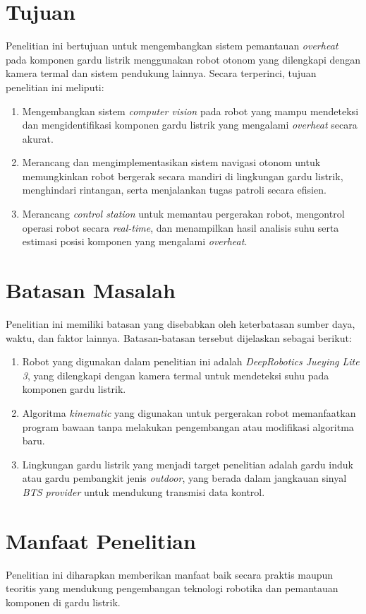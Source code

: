 \section{Tujuan}
Penelitian ini bertujuan untuk mengembangkan sistem pemantauan \emph{overheat} pada komponen gardu listrik menggunakan robot otonom yang dilengkapi dengan kamera termal dan sistem pendukung lainnya. Secara terperinci, tujuan penelitian ini meliputi:
\begin{enumerate}
    \item Mengembangkan sistem \emph{computer vision} pada robot yang mampu mendeteksi dan mengidentifikasi komponen gardu listrik yang mengalami \emph{overheat} secara akurat.
    \item Merancang dan mengimplementasikan sistem navigasi otonom untuk memungkinkan robot bergerak secara mandiri di lingkungan gardu listrik, menghindari rintangan, serta menjalankan tugas patroli secara efisien.
    \item Merancang \emph{control station} untuk memantau pergerakan robot, mengontrol operasi robot secara \emph{real-time}, dan menampilkan hasil analisis suhu serta estimasi posisi komponen yang mengalami \emph{overheat}.
\end{enumerate}

\section{Batasan Masalah}
Penelitian ini memiliki batasan yang disebabkan oleh keterbatasan sumber daya, waktu, dan faktor lainnya. Batasan-batasan tersebut dijelaskan sebagai berikut:
\begin{enumerate}
    \item Robot yang digunakan dalam penelitian ini adalah \emph{DeepRobotics Jueying Lite 3}, yang dilengkapi dengan kamera termal untuk mendeteksi suhu pada komponen gardu listrik.
    \item Algoritma \emph{kinematic} yang digunakan untuk pergerakan robot memanfaatkan program bawaan tanpa melakukan pengembangan atau modifikasi algoritma baru.
    \item Lingkungan gardu listrik yang menjadi target penelitian adalah gardu induk atau gardu pembangkit jenis \emph{outdoor}, yang berada dalam jangkauan sinyal \emph{BTS provider} untuk mendukung transmisi data kontrol.
\end{enumerate}
\section{Manfaat Penelitian}
Penelitian ini diharapkan memberikan manfaat baik secara praktis maupun teoritis yang mendukung pengembangan teknologi robotika dan pemantauan komponen di gardu listrik.

